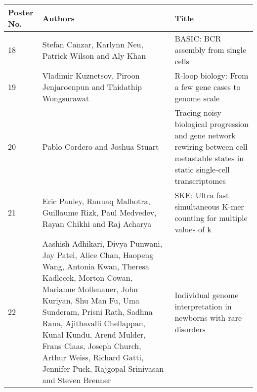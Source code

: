 \documentclass[11pt]{article}
\begin{document}
\vspace*{-1cm}
{
\centering
\begin{tabular}{p{1cm}p{8cm}p{8cm}}
{\bf Poster No.} & {\bf Authors}  & {\bf Title}   \\ \hline
18            & Stefan Canzar, Karlynn Neu, Patrick Wilson and Aly Khan                                                                                                                                                                                                                                                                                                                      & BASIC: BCR assembly from single cells                                                                                              \\ \hline
19            & Vladimir Kuznetsov, Piroon Jenjaroenpun and Thidathip Wongsurawat                                                                                                                                                                                                                                                                                                            & R-loop biology: From a few gene cases to genome scale                                                                              \\ \hline
20            & Pablo Cordero and Joshua Stuart                                                                                                                                                                                                                                                                                                                                              & Tracing noisy biological progression and gene network rewiring between cell metastable states in static single-cell transcriptomes \\ \hline
21            & Eric Pauley, Raunaq Malhotra, Guillaume Rizk, Paul Medvedev, Rayan Chikhi and Raj Acharya                                                                                                                                                                                                                                                                                    & SKE: Ultra fast simultaneous K-mer counting for multiple values of k                                                               \\ \hline
22            & Aashish Adhikari, Divya Punwani, Jay Patel, Alice Chan, Haopeng Wang, Antonia Kwan, Theresa Kadlecek, Morton Cowan, Marianne Mollenauer, John Kuriyan, Shu Man Fu, Uma Sunderam, Prisni Rath, Sadhna Rana, Ajithavalli Chellappan, Kunal Kundu, Arend Mulder, Frans Claas, Joseph Church, Arthur Weiss, Richard Gatti, Jennifer Puck, Rajgopal Srinivasan and Steven Brenner & Individual genome interpretation in newborns with rare disorders                                                                   \\ \hline

\end{tabular}}
\end{document}

